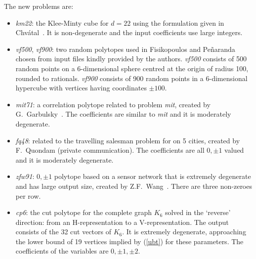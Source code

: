 \documentclass[a4paper,11pt]{article}   \usepackage{authblk} \usepackage[top=1.9cm,bottom=1.9cm,left=1.9cm,right=1.9cm]{geometry}
\newcommand{\polytope}{\emph}
\newcommand{\fqfour}{\polytope{fq48}\xspace}
\newcommand{\mitseven}{\polytope{mit71}\xspace}
\newcommand{\mitine}{\polytope{mit}\xspace}
\newcommand{\cpsix}{\polytope{cp6}\xspace}
\newcommand{\vffive}{\polytope{vf500}\xspace}
\newcommand{\kmtwo}{\polytope{km22}\xspace}
\newcommand{\vfnine}{\polytope{vf900}\xspace}
\newcommand{\zfw}{\polytope{zfw91}\xspace}
\begin{document}
The new problems are:
\begin{itemize}
\item \kmtwo: the Klee-Minty cube for $d=22$ using the formulation given in Chv{\'a}tal~\cite{Chvatal}.
It is non-degenerate and the input coefficients use large integers.
\item \vffive, \vfnine: two random polytopes used in Fisikopoulos and Pe{\~{n}}aranda~\cite{FP16} chosen from input files
kindly provided by the authors.
\vffive consists of 500 random points on a 6-dimensional sphere centred at the origin of
radius 100, rounded to rationals. \vfnine consists of 900 random points in
a 6-dimensional hypercube with
vertices having coordinates $\pm100$.
\item \mitseven: a correlation polytope related to problem \mitine, created by G.\ Garbulsky~\cite{ceder1994}.
The coefficients are similar to \mitine and it is moderately degenerate.
\item \fqfour: related to the travelling salesman problem for on 5 cities, created by F.\ Quondam
(private communication).
The coefficients are all $0,\pm 1$ valued and it is moderately degenerate.
\item \zfw: $0, \pm1$ polytope based on a sensor network that is extremely degenerate
and has large output size, created by Z.F.\ Wang~\cite{zfw14}. There are three non-zeroes per row.
\item \cpsix: the cut polytope for the complete graph $K_6$ solved in the `reverse' direction: from an H-representation to a V-representation.
The output consists of the 32 cut vectors of $K_6$. It is extremely degenerate,  approaching the lower bound
of 19 vertices implied by (\ref{ubt}) for these parameters.
The coefficients of the variables are $0, \pm 1, \pm 2$.
\end{itemize}
\end{document}
